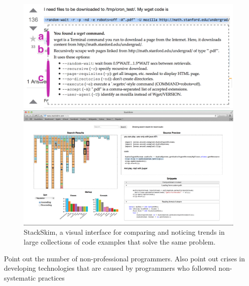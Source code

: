 \documentclass[12pt]{memoir}
\begin{document}
\begin{figure}%
  \centering
  \parbox{.45\textwidth}{%
    \includegraphics[width=\linewidth]{figures/tutorons_microexplanation}
    \caption{%
      A micro-explanation for a command line generated by a Tutoron with multiple levels of detail 
      (definition, high-level intent, arguments)
    }\label{fig:tutorons_microexplanation}
  }%
  \qquad
  \parbox{.45\textwidth}{%
    \includegraphics[width=\linewidth]{figures/stackskim_ui}
    \caption{%
      StackSkim, a visual interface for comparing and noticing trends in large collections of code examples that solve the same problem.
    }\label{fig:stackskim_ui}
  }
\end{figure}
\fi

Point out the number of non-professional programmers.
Also point out crises in developing technologies that are caused by programmers who followed non-systematic practices
\end{document}
